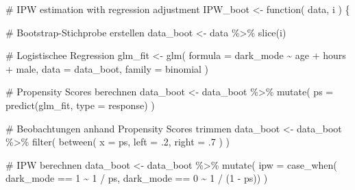 \documentclass[
  a4paper,
  DIV=11,
  oneside]{scrreprt}
\newenvironment{Shaded}{\begin{snugshade}}{\end{snugshade}}
\newcommand{\AttributeTok}[1]{\textcolor[rgb]{0.40,0.45,0.13}{#1}}
\newcommand{\CommentTok}[1]{\textcolor[rgb]{0.37,0.37,0.37}{#1}}
\newcommand{\ControlFlowTok}[1]{\textcolor[rgb]{0.00,0.23,0.31}{#1}}
\newcommand{\DecValTok}[1]{\textcolor[rgb]{0.68,0.00,0.00}{#1}}
\newcommand{\FunctionTok}[1]{\textcolor[rgb]{0.28,0.35,0.67}{#1}}
\newcommand{\NormalTok}[1]{\textcolor[rgb]{0.00,0.23,0.31}{#1}}
\newcommand{\OtherTok}[1]{\textcolor[rgb]{0.00,0.23,0.31}{#1}}
\newcommand{\SpecialCharTok}[1]{\textcolor[rgb]{0.37,0.37,0.37}{#1}}
\newcommand{\StringTok}[1]{\textcolor[rgb]{0.13,0.47,0.30}{#1}}
\begin{document}
\begin{Shaded}
\begin{Highlighting}[]
\CommentTok{\# IPW estimation with regression adjustment}
\NormalTok{IPW\_boot }\OtherTok{\textless{}{-}} \ControlFlowTok{function}\NormalTok{(}
\NormalTok{    data, }
\NormalTok{    i}
\NormalTok{) \{}
  
  \CommentTok{\# Bootstrap{-}Stichprobe erstellen}
\NormalTok{  data\_boot  }\OtherTok{\textless{}{-}}\NormalTok{ data }\SpecialCharTok{\%\textgreater{}\%} 
    \FunctionTok{slice}\NormalTok{(i)}
  
  \CommentTok{\# Logistischee Regression}
\NormalTok{  glm\_fit }\OtherTok{\textless{}{-}} \FunctionTok{glm}\NormalTok{(}
    \AttributeTok{formula =}\NormalTok{ dark\_mode }\SpecialCharTok{\textasciitilde{}}\NormalTok{ age }\SpecialCharTok{+}\NormalTok{ hours }\SpecialCharTok{+}\NormalTok{ male,}
    \AttributeTok{data =}\NormalTok{ data\_boot, }
    \AttributeTok{family =}\NormalTok{ binomial}
\NormalTok{  )}
  
  \CommentTok{\# Propensity Scores berechnen}
\NormalTok{  data\_boot }\OtherTok{\textless{}{-}}\NormalTok{ data\_boot }\SpecialCharTok{\%\textgreater{}\%}
    \FunctionTok{mutate}\NormalTok{(}
      \AttributeTok{ps =} \FunctionTok{predict}\NormalTok{(glm\_fit, }\AttributeTok{type =} \StringTok{\textquotesingle{}response\textquotesingle{}}\NormalTok{)}
\NormalTok{    )}
  
  \CommentTok{\# Beobachtungen anhand Propensity Scores trimmen}
\NormalTok{  data\_boot }\OtherTok{\textless{}{-}}\NormalTok{ data\_boot }\SpecialCharTok{\%\textgreater{}\%}
    \FunctionTok{filter}\NormalTok{(}
      \FunctionTok{between}\NormalTok{(}
        \AttributeTok{x =}\NormalTok{ ps,}
        \AttributeTok{left =}\NormalTok{ .}\DecValTok{2}\NormalTok{,}
        \AttributeTok{right =}\NormalTok{ .}\DecValTok{7}
\NormalTok{      )}
\NormalTok{    )}
  
  \CommentTok{\# IPW berechnen}
\NormalTok{  data\_boot }\OtherTok{\textless{}{-}}\NormalTok{ data\_boot }\SpecialCharTok{\%\textgreater{}\%}
    \FunctionTok{mutate}\NormalTok{(}
      \AttributeTok{ipw =} \FunctionTok{case\_when}\NormalTok{(}
\NormalTok{        dark\_mode }\SpecialCharTok{==} \DecValTok{1} \SpecialCharTok{\textasciitilde{}} \DecValTok{1} \SpecialCharTok{/}\NormalTok{ ps,}
\NormalTok{        dark\_mode }\SpecialCharTok{==} \DecValTok{0} \SpecialCharTok{\textasciitilde{}} \DecValTok{1} \SpecialCharTok{/}\NormalTok{ (}\DecValTok{1} \SpecialCharTok{{-}}\NormalTok{ ps))}
\NormalTok{    )}
  

\end{Highlighting}
\end{Shaded}
\end{document}
